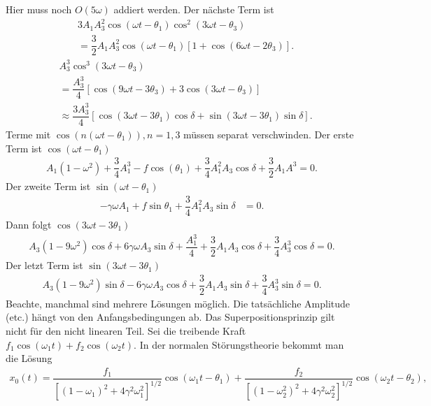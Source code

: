 \documentclass[a4paper,12pt]{article}
\numberwithin{equation}{section}
\begin{document}
Hier muss noch $O\left(5\omega \right)$ addiert werden. Der nächste Term ist
\begin{align*} 
        &3A_1A_3^2\cos \left(\omega t-\theta _1\right)\cos ^2\left(3\omega t-\theta _3\right)\\
        &=\dfrac{3}{2}A_1A_3^2\cos \left(\omega t-\theta _1\right)\left[1+\cos \left(6\omega t-2\theta _3\right)\right]
.\end{align*} 
\begin{align*} 
        &A_3^3\cos ^3\left(3\omega t-\theta _3\right)\\
        &=\dfrac{A_3^3}{4}\left[\cos \left(9\omega t-3\theta _3\right)+3\cos \left(3\omega t-\theta _3\right)\right]\\
        &\approx \dfrac{3A_3^3}{4}\left[\cos \left(3\omega t-3\theta _1\right)\cos \delta +\sin \left(3\omega t-3\theta _1\right)\sin \delta \right]
.\end{align*} 
Terme mit $\cos \left(n\left(\omega t-\theta _1\right)\right),n=1,3$ müssen separat verschwinden. Der erste Term ist $\cos \left(\omega t-\theta _1\right)$ 
\begin{align*} 
        A_1\left(1-\omega ^2\right)+\dfrac{3}{4}A_1^3-f\cos \left(\theta _1\right)+\dfrac{3}{4}A_1^2A_3\cos \delta +\dfrac{3}{2}A_1A^3=0
.\end{align*} 
Der zweite Term ist $\sin \left(\omega t-\theta _1\right)$ 
\begin{align*} 
        -\gamma \omega A_1+f\sin \theta _1+\dfrac{3}{4}A_1^2A_3\sin \delta &=0
.\end{align*} 
Dann folgt $\cos \left(3\omega t-3\theta _1\right)$ 
\begin{align*} 
        A_3\left(1-9\omega ^2\right)\cos \delta +6\gamma \omega A_3\sin \delta +\dfrac{A_1^3}{4}+\dfrac{3}{2}A_1A_3\cos \delta +\dfrac{3}{4}A_3^3\cos \delta =0
.\end{align*} 
Der letzt Term ist $\sin \left(3\omega t-3\theta _1\right)$ 
\begin{align} 
        A_3\left(1-9\omega ^2\right)\sin \delta -6\gamma \omega A_3\cos \delta +\dfrac{3}{2}A_1A_3\sin \delta +\dfrac{3}{4}A_3^3\sin \delta =0\label{eq:9.55}
.\end{align} 
Beachte, manchmal sind mehrere Lösungen möglich. Die tatsächliche Amplitude (etc.) hängt von den Anfangsbedingungen ab. Das Superpositionsprinzip gilt nicht für den nicht linearen Teil. Sei die treibende Kraft $f_1\cos \left(\omega _1t\right)+f_2\cos \left(\omega _2t\right)$. In der normalen Störungstheorie bekommt man die Lösung
\begin{align*} 
        x_0\left(t\right)=\dfrac{f_1}{\left[\left(1-\omega _1\right)^2+4\gamma ^2\omega _1^2\right]^{1/2}}\cos \left(\omega _1t-\theta _1\right)+\dfrac{f_2}{\left[\left(1-\omega _2^2\right)^2+4\gamma ^2\omega _2^2\right]^{1/2}}\cos \left(\omega _2t-\theta _2\right)
,\end{align*} 
\end{document}
